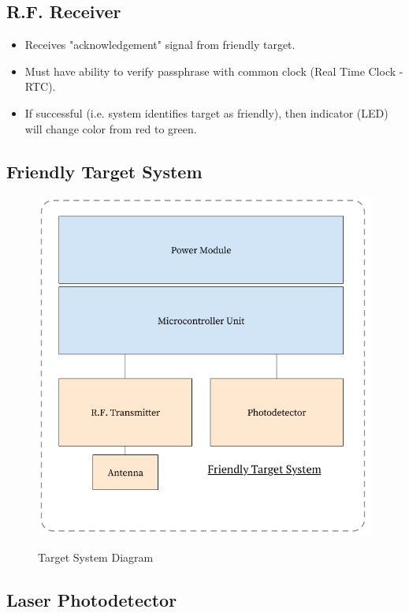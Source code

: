 \documentclass[openbib,letterpaper,10pt]{article}
\begin{document}
\begin{spacing}{1.15}
 \subsection*{{\normalsize  R.F. Receiver}}
\begin{itemize}
	\item Receives "acknowledgement" signal from friendly target.
	\item Must have ability to verify passphrase with common clock (Real Time Clock - RTC).
	\item If successful (i.e. system identifies target as friendly), then indicator (LED) will change color from red to green.
\end{itemize}
 
 \subsection*{Friendly Target System}
 
 \begin{figure} [H]
 	\centering
 	\includegraphics[scale=0.35]{Target_Diagram.png}
 	\label{fig:system-diagram}
 	\vspace{-10mm}
 	\caption{Target System Diagram}
 \end{figure}
 
\subsection*{{\normalsize Laser Photodetector}}


\end{spacing}
\end{document}
